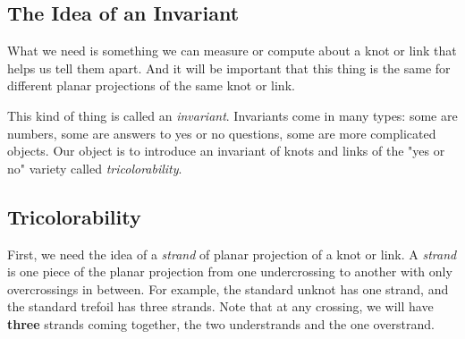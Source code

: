 \documentclass[12pt,letterpaper]{article}
\theoremstyle{definition}
\begin{document}
\subsection*{The Idea of an Invariant}

What we need is something we can measure or compute about a knot or link that helps us tell them apart. And it will be important that this thing is the same for different planar projections of the same knot or link.

This kind of thing is called an \emph{invariant}.
Invariants come in many types: some are numbers, some are answers to yes or no questions, some are more complicated objects. Our object is to introduce an invariant of knots and links of the "yes or no" variety called \emph{tricolorability}.

\subsection*{Tricolorability}

First, we need the idea of a \emph{strand} of planar projection of a knot or link. 
A \emph{strand} is one piece of the planar projection from one undercrossing to another with only overcrossings in between. 
For example, the standard unknot has one strand, and the standard trefoil has three strands.
Note that at any crossing, we will have \textbf{three} strands coming together, the two understrands and the one overstrand.
\end{document}
